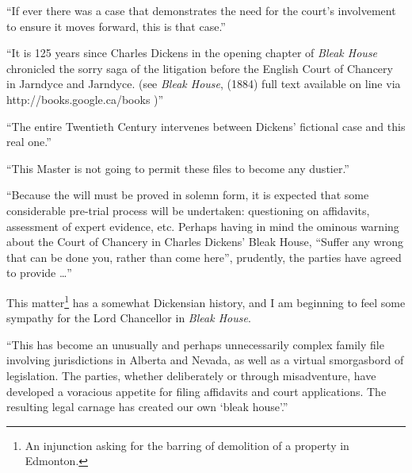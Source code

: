 ``If ever there was a case that demonstrates the need for the court’s 
involvement to ensure it moves forward, this is that case.''

``It is 125 years since Charles Dickens in the opening chapter of \textit{Bleak House} chronicled the sorry saga of the litigation before the English Court of Chancery in Jarndyce and Jarndyce. (see \textit{Bleak House}, (1884) full text available on line via http://books.google.ca/books )''
 
``The entire Twentieth Century intervenes between Dickens’ fictional case and this real one.''

``This Master is not going to permit these files to become any dustier.''
\bigskip


``Because the will must be proved in solemn form, it is expected that some considerable pre-trial process will be undertaken: questioning on affidavits, assessment of expert evidence, etc.  Perhaps having in mind the ominous warning about the Court of Chancery in Charles Dickens’ Bleak House, “Suffer any wrong that can be done you, rather than come here”, prudently, the parties have agreed to provide \ldots ''
\bigskip



%

This matter\footnote{An injunction asking for the barring of demolition of a property in Edmonton.} has a somewhat Dickensian history, and I am beginning to feel some sympathy for the Lord Chancellor in \textit{Bleak House}.\bigskip



``This has become an unusually and perhaps unnecessarily complex family file involving jurisdictions in Alberta and Nevada, as well as a virtual smorgasbord of legislation. The parties, whether deliberately or through misadventure, have developed a voracious appetite for filing affidavits and court applications. The resulting legal carnage has created our own `bleak house'.''
\bigskip



 
